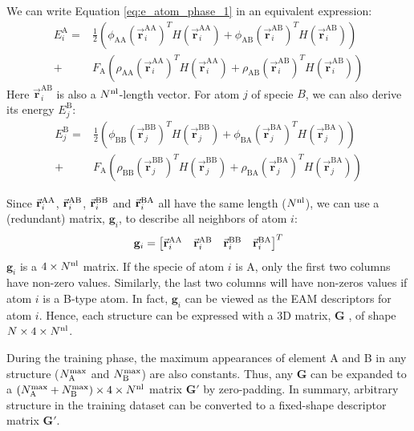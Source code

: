 \documentclass[final,3p,times]{elsarticle}
\begin{document}
We can write Equation \ref{eq:e_atom_phase_1} in an equivalent expression:
\begin{align}
E_{i}^{\mathrm{A}} 
\label{eq:e_atom_A}
= &
\frac{1}{2}\left( 
    \phi_{\mathrm{AA}}(\vec{\mathbf{r}}_{i}^{\mathrm{AA}})^T
    H(\vec{\mathbf{r}}_{i}^{\mathrm{AA}}) +
    \phi_{\mathrm{AB}}(\vec{\mathbf{r}}_{i}^{\mathrm{AB}})^T
    H(\vec{\mathbf{r}}_{i}^{\mathrm{AB}})
\right) \nonumber \\
+ &
F_{\mathrm{A}}\left( 
    \rho_{\mathrm{AA}}(\vec{\mathbf{r}}_{i}^{\mathrm{AA}})^T
    H(\vec{\mathbf{r}}_{i}^{\mathrm{AA}}) +
    \rho_{\mathrm{AB}}(\vec{\mathbf{r}}_{i}^{\mathrm{AB}})^T
    H(\vec{\mathbf{r}}_{i}^{\mathrm{AB}})
\right)
\end{align}
Here $\vec{\mathbf{r}}_{i}^{\mathrm{AB}}$ is also a $N^{\mathrm{nl}}$-length vector. For 
atom $j$ of specie $B$, we can also derive its energy $E^{\mathrm{B}}_{j}$:
\begin{align}
E_{j}^{\mathrm{B}}
\label{eq:e_atom_B}
= &
\frac{1}{2}\left( 
    \phi_{\mathrm{BB}}(\vec{\mathbf{r}}_{j}^{\mathrm{BB}})^T
    H(\vec{\mathbf{r}}_{j}^{\mathrm{BB}}) +
    \phi_{\mathrm{BA}}(\vec{\mathbf{r}}_{j}^{\mathrm{BA}})^T
    H(\vec{\mathbf{r}}_{j}^{\mathrm{BA}})
\right) \nonumber \\
+ &
F_{\mathrm{A}}\left( 
    \rho_{\mathrm{BB}}(\vec{\mathbf{r}}_{j}^{\mathrm{BB}})^T
    H(\vec{\mathbf{r}}_{j}^{\mathrm{BB}}) +
    \rho_{\mathrm{BA}}(\vec{\mathbf{r}}_{j}^{\mathrm{BA}})^T
    H(\vec{\mathbf{r}}_{j}^{\mathrm{BA}})
\right)
\end{align}

Since $\vec{\mathbf{r}}_{i}^{\mathrm{AA}}$, $\vec{\mathbf{r}}_{i}^{\mathrm{AB}}$, $\vec{\mathbf{r}}_{i}^{\mathrm{BB}}$ and $\vec{\mathbf{r}}_{i}^{\mathrm{BA}}$ all have the same length ($N^{\mathrm{nl}}$), 
we can use a (redundant) matrix, $\mathbf{g}_{i}$, to describe all neighbors of 
atom $i$:
\begin{equation}
\mathbf{g}_i = \begin{bmatrix}
    \vec{\mathbf{r}}_{i}^{\mathrm{AA}} & \vec{\mathbf{r}}_{i}^{\mathrm{AB}} & \vec{\mathbf{r}}_{i}^{\mathrm{BB}} & \vec{\mathbf{r}}_{i}^{\mathrm{BA}} \\
\end{bmatrix}^T
\end{equation}
$\mathbf{g}_i$ is a $4 \times N^{\mathrm{nl}}$ matrix. If the specie of atom $i$ is A, only
the first two columns have non-zero values. Similarly, the last two columns will
have non-zeros values if atom $i$ is a B-type atom. In fact, $\mathbf{g}_i$ can
be viewed as the EAM descriptors for atom $i$. Hence, each structure can be 
expressed with a 3D matrix, $\mathbf{G}$ , of shape $N \times 4 \times N^{\mathrm{nl}}$.

During the training phase, the maximum appearances of element A and B in any 
structure ($N_{\mathrm{A}}^{\mathrm{max}}$ and $N_{\mathrm{B}}^{\mathrm{max}}$) are also constants. Thus, any $\mathbf{G}$ can 
be expanded to a $(N_{\mathrm{A}}^{\mathrm{max}} + N_{\mathrm{B}}^{\mathrm{max}}) \times 4 \times N^{\mathrm{nl}}$ matrix $\mathbf{G}'$ 
by zero-padding. In summary, arbitrary structure in the training dataset can be 
converted to a fixed-shape descriptor matrix $\mathbf{G}'$. 
\end{document}
